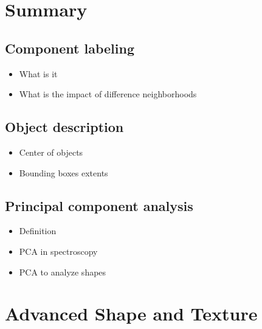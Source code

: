 \documentclass[letterpaper,10pt,english]{sphinxmanual}
\begin{document}
\chapter{Summary}
\label{\detokenize{06-ShapeAnalysis:summary}}

\section{Component labeling}
\label{\detokenize{06-ShapeAnalysis:component-labeling}}\begin{itemize}
\item {} 
\sphinxAtStartPar
What is it

\item {} 
\sphinxAtStartPar
What is the impact of difference neighborhoods

\end{itemize}


\section{Object description}
\label{\detokenize{06-ShapeAnalysis:object-description}}\begin{itemize}
\item {} 
\sphinxAtStartPar
Center of objects

\item {} 
\sphinxAtStartPar
Bounding boxes \sphinxhyphen{} extents

\end{itemize}


\section{Principal component analysis}
\label{\detokenize{06-ShapeAnalysis:id4}}\begin{itemize}
\item {} 
\sphinxAtStartPar
Definition

\item {} 
\sphinxAtStartPar
PCA in spectroscopy

\item {} 
\sphinxAtStartPar
PCA to analyze shapes

\end{itemize}


\chapter{Advanced Shape and Texture}
\label{\detokenize{06-AdvancedShapeAndTexture:advanced-shape-and-texture}}\label{\detokenize{06-AdvancedShapeAndTexture::doc}}
\end{document}
